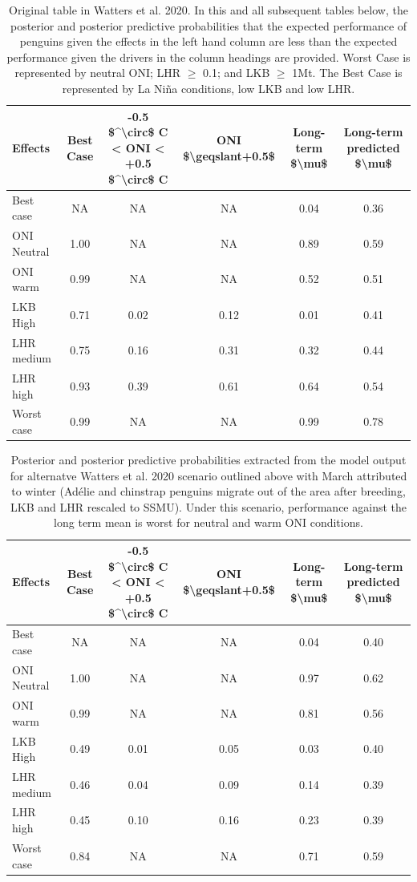 \documentclass[]{elsarticle} %
\begin{document}
\begin{landscape}

\begin{longtable}[t]{lccccc}
\caption{\label{tab:Table 1 Scenario Original}Original table in Watters et al. 2020.  In this and all subsequent tables below, the posterior and posterior predictive probabilities that the expected performance of penguins given the effects in the left hand column are less than the expected performance given the drivers in the column headings are provided. Worst Case is represented by neutral ONI; LHR  $\geqslant$ 0.1; and LKB $\geqslant$ 1Mt.  The Best Case is represented by La Niña conditions, low LKB and low LHR.}\\
\toprule
Effects & Best Case & -0.5 \$\textasciicircum{}\textbackslash{}circ\$ C < ONI < +0.5 \$\textasciicircum{}\textbackslash{}circ\$ C & ONI \$\textbackslash{}geqslant+0.5\$ & Long-term \$\textbackslash{}mu\$ & Long-term predicted \$\textbackslash{}mu\$\\
\midrule
Best case & NA & NA & NA & 0.04 & 0.36\\
ONI Neutral & 1.00 & NA & NA & 0.89 & 0.59\\
ONI warm & 0.99 & NA & NA & 0.52 & 0.51\\
LKB High & 0.71 & 0.02 & 0.12 & 0.01 & 0.41\\
LHR medium & 0.75 & 0.16 & 0.31 & 0.32 & 0.44\\
\addlinespace
LHR high & 0.93 & 0.39 & 0.61 & 0.64 & 0.54\\
Worst case & 0.99 & NA & NA & 0.99 & 0.78\\
\bottomrule
\end{longtable}

\begin{longtable}[t]{lccccc}
\caption{\label{tab:Table 1 Scenario 37a}Posterior and posterior predictive probabilities extracted from the model output for alternatve Watters et al. 2020 scenario outlined above with March attributed to winter (Adélie and chinstrap penguins migrate out of the area after breeding, LKB and LHR rescaled to SSMU). Under this scenario, performance against the long term mean is worst for neutral and warm ONI conditions.}\\
\toprule
Effects & Best Case & -0.5 \$\textasciicircum{}\textbackslash{}circ\$ C < ONI < +0.5 \$\textasciicircum{}\textbackslash{}circ\$ C & ONI \$\textbackslash{}geqslant+0.5\$ & Long-term \$\textbackslash{}mu\$ & Long-term predicted \$\textbackslash{}mu\$\\
\midrule
Best case & NA & NA & NA & 0.04 & 0.40\\
ONI Neutral & 1.00 & NA & NA & 0.97 & 0.62\\
ONI warm & 0.99 & NA & NA & 0.81 & 0.56\\
LKB High & 0.49 & 0.01 & 0.05 & 0.03 & 0.40\\
LHR medium & 0.46 & 0.04 & 0.09 & 0.14 & 0.39\\
\addlinespace
LHR high & 0.45 & 0.10 & 0.16 & 0.23 & 0.39\\
Worst case & 0.84 & NA & NA & 0.71 & 0.59\\
\bottomrule
\end{longtable}
\end{landscape}
\end{document}
